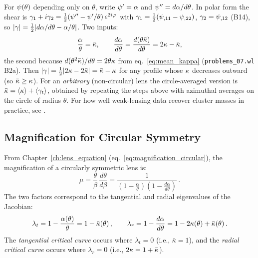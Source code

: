 \begin{derivation}[$|\gammaL| = \bar\kappa-\kappab$ from the potential]
For $\psi(\theta)$ depending only on $\theta$, write $\psi' = \alpha$ and
$\psi'' = d\alpha/d\theta$.  In polar form the shear is
$\gamma_1+i\gamma_2 = \tfrac{1}{2}(\psi''-\psi'/\theta)\,e^{2i\varphi}$ with
$\gamma_1 = \tfrac{1}{2}(\psi_{,11}-\psi_{,22})$, $\gamma_2 = \psi_{,12}$ (B14), so
$|\gamma| = \tfrac{1}{2}|d\alpha/d\theta-\alpha/\theta|$.  Two inputs:
\[
  \frac{\alpha}{\theta} = \bar\kappa, \qquad
  \frac{d\alpha}{d\theta} = \frac{d(\theta\bar\kappa)}{d\theta} = 2\kappa-\bar\kappa ,
\]
the second because $d(\theta^2\bar\kappa)/d\theta = 2\theta\kappa$ from
eq.~\eqref{eq:mean_kappa} (\texttt{problems\_07.wl} B2a).  Then
$|\gamma| = \tfrac{1}{2}|2\kappa-2\bar\kappa| = \bar\kappa-\kappa$ for any profile whose
$\kappa$ decreases outward (so $\bar\kappa\geq\kappa$).  For an
\emph{arbitrary} (non-circular) lens the circle-averaged version is
$\bar\kappa = \langle\kappa\rangle+\langle\gamma_t\rangle$, obtained by repeating the
steps above with azimuthal averages on the circle of radius $\theta$.  For how
well weak-lensing data recover cluster masses in practice, see
\citet{bartelmann_1995}.
\end{derivation}

\subsection{Magnification for Circular Symmetry}

From Chapter~\ref{ch:lens_equation} (eq.~\ref{eq:magnification_circular}),
the magnification of a circularly symmetric lens is:
\begin{equation}
    \mu = \frac{\theta}{\beta}\,
    \frac{d\theta}{d\beta}
    = \frac{1}{\left(1 - \frac{\alpha}{\theta}\right)
    \left(1 - \frac{d\alpha}{d\theta}\right)} \,.
    \label{eq:mu_circular}
\end{equation}
The two factors correspond to the tangential and radial eigenvalues
of the Jacobian:
\begin{equation}
    \lambda_t = 1 - \frac{\alpha(\theta)}{\theta}
    = 1 - \bar{\kappa}(\theta) \,, \qquad
    \lambda_r = 1 - \frac{d\alpha}{d\theta}
    = 1 - 2\kappa(\theta) + \bar{\kappa}(\theta) \,.
    \label{eq:eigenvalues_circular}
\end{equation}
The \emph{tangential critical curve} occurs where $\lambda_t = 0$
(i.e., $\bar{\kappa} = 1$), and the \emph{radial critical curve}
occurs where $\lambda_r = 0$ (i.e., $2\kappa = 1 + \bar{\kappa}$).

